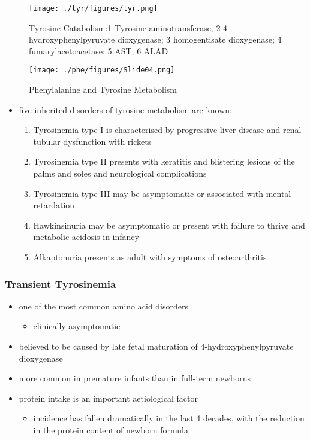 \documentclass{scrartcl}
\begin{document}
\begin{figure}[htbp]
\centering
\texttt{[image: ./tyr/figures/tyr.png]}
\caption{\label{fig:org82fb7c8}
Tyrosine Catabolism:1 Tyrosine aminotransferase; 2 4-hydroxyphenylpyruvate dioxygenase; 3 homogentisate dioxygenase; 4 fumarylacetoacetase; 5 AST; 6 ALAD}
\end{figure}


\begin{figure}[htbp]
\centering
\texttt{[image: ./phe/figures/Slide04.png]}
\caption{\label{fig:org990c749}
Phenylalanine and Tyrosine Metabolism}
\end{figure}

\begin{itemize}
\item five inherited disorders of tyrosine metabolism are known:
\begin{enumerate}
\item Tyrosinemia type I is characterised by progressive
liver disease and renal tubular dysfunction with rickets
\item Tyrosinemia type II presents with keratitis and
blistering lesions of the palms and soles and neurological
complications
\item Tyrosinemia type III may be asymptomatic or associated with
mental retardation
\item Hawkinsinuria may be asymptomatic or present with failure to
thrive and metabolic acidosis in infancy
\item Alkaptonuria presents as adult with symptoms of osteoarthritis
\end{enumerate}
\end{itemize}

\subsubsection{Transient Tyrosinemia}
\label{sec:orge622c7e}
\begin{itemize}
\item one of the most common amino acid disorders
\begin{itemize}
\item clinically asymptomatic
\end{itemize}
\item believed to be caused by late fetal maturation of
4-hydroxyphenylpyruvate dioxygenase
\item more common in premature infants than in full-term newborns
\item protein intake is an important aetiological factor
\begin{itemize}
\item incidence has fallen dramatically in the last 4 decades, with the
reduction in the protein content of newborn formula
\end{itemize}
\end{itemize}
\end{document}

